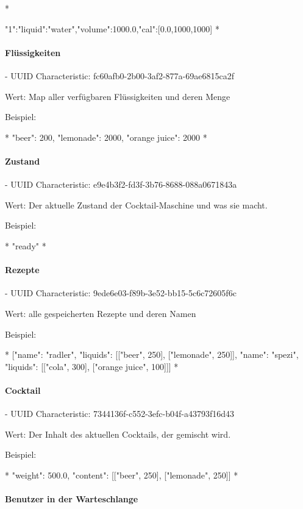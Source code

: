 *
{"1":{"liquid":"water","volume":1000.0,"cal":[0.0,1000,1000]}
	*
	
	\paragraph{ Flüssigkeiten}
	
	- UUID Characteristic: fc60afb0-2b00-3af2-877a-69ae6815ca2f
	
	Wert: Map aller verfügbaren Flüssigkeiten und deren Menge
	
	Beispiel:
	
	*
	{"beer": 200, "lemonade": 2000, "orange juice": 2000}
	*
	
	\paragraph{ Zustand}
	
	- UUID Characteristic: e9e4b3f2-fd3f-3b76-8688-088a0671843a
	
	Wert: Der aktuelle Zustand der Cocktail-Maschine und was sie macht.
	
	Beispiel:
	
	*
	"ready"
	*
	
	\paragraph{ Rezepte}
	
	- UUID Characteristic: 9ede6e03-f89b-3e52-bb15-5c6c72605f6c
	
	Wert: alle gespeicherten Rezepte und deren Namen
	
	Beispiel:
	
	*
	[{"name": "radler", "liquids": [["beer", 250], ["lemonade", 250]]}, {"name": "spezi", "liquids": [["cola", 300], ["orange juice", 100]]}]
	*
	
	\paragraph{ Cocktail}
	
	- UUID Characteristic: 7344136f-c552-3efc-b04f-a43793f16d43
	
	Wert: Der Inhalt des aktuellen Cocktails, der gemischt wird.
	
	Beispiel:
	
	*
	{"weight": 500.0, "content": [["beer", 250], ["lemonade", 250]]}
	*
	
	\paragraph{ Benutzer in der Warteschlange}
	
}
